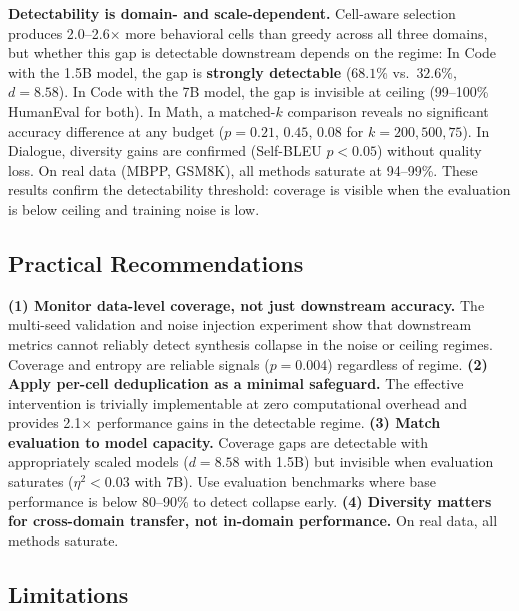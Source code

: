 \documentclass{article}
\begin{document}
\begin{enumerate}[nosep]
\textbf{Detectability is domain- and scale-dependent.}
Cell-aware selection produces 2.0--2.6$\times$ more behavioral cells than greedy across all three domains, but whether this gap is detectable downstream depends on the regime:
In Code with the 1.5B model, the gap is \textbf{strongly detectable} ($68.1\%$ vs.\ $32.6\%$, $d{=}8.58$).
In Code with the 7B model, the gap is invisible at ceiling (99--100\% HumanEval for both).
In Math, a matched-$k$ comparison reveals no significant accuracy difference at any budget ($p{=}0.21$, $0.45$, $0.08$ for $k{=}200,500,75$).
In Dialogue, diversity gains are confirmed (Self-BLEU $p{<}0.05$) without quality loss.
On real data (MBPP, GSM8K), all methods saturate at 94--99\%.
These results confirm the detectability threshold: coverage is visible when the evaluation is below ceiling and training noise is low.

\subsection{Practical Recommendations}

\textbf{(1) Monitor data-level coverage, not just downstream accuracy.} The multi-seed validation and noise injection experiment show that downstream metrics cannot reliably detect synthesis collapse in the noise or ceiling regimes. Coverage and entropy are reliable signals ($p{=}0.004$) regardless of regime.
\textbf{(2) Apply per-cell deduplication as a minimal safeguard.} The effective intervention is trivially implementable at zero computational overhead and provides 2.1$\times$ performance gains in the detectable regime.
\textbf{(3) Match evaluation to model capacity.} Coverage gaps are detectable with appropriately scaled models ($d{=}8.58$ with 1.5B) but invisible when evaluation saturates ($\eta^2{<}0.03$ with 7B). Use evaluation benchmarks where base performance is below 80--90\% to detect collapse early.
\textbf{(4) Diversity matters for cross-domain transfer, not in-domain performance.} On real data, all methods saturate.

\subsection{Limitations}


\end{enumerate}
\end{document}
